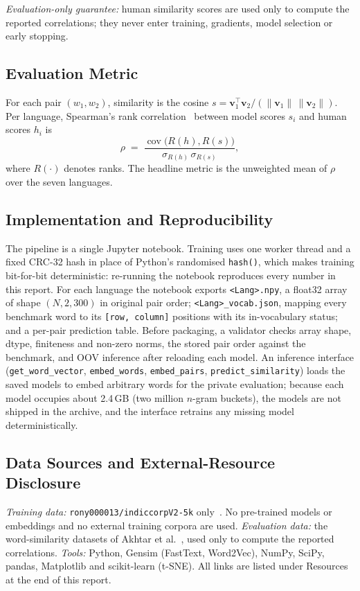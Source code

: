\documentclass[conference,10pt]{IEEEtran}
\begin{document}
\textit{Evaluation-only guarantee:} human similarity scores are used only to compute the reported correlations; they never enter training, gradients, model selection or early stopping.

\subsection{Evaluation Metric}\label{sec:metric}
For each pair $(w_1, w_2)$, similarity is the cosine $s = \mathbf{v}_1^{\top}\mathbf{v}_2 / (\lVert\mathbf{v}_1\rVert\,\lVert\mathbf{v}_2\rVert)$. Per language, Spearman's rank correlation~\cite{spearman1904} between model scores $s_i$ and human scores $h_i$ is
\begin{equation}
\rho \;=\; \frac{\operatorname{cov}\!\big(R(h), R(s)\big)}{\sigma_{R(h)}\,\sigma_{R(s)}},
\label{eq:spearman}
\end{equation}
where $R(\cdot)$ denotes ranks. The headline metric is the unweighted mean of $\rho$ over the seven languages.

\subsection{Implementation and Reproducibility}
The pipeline is a single Jupyter notebook. Training uses one worker thread and a fixed CRC-32 hash in place of Python's randomised \texttt{hash()}, which makes training bit-for-bit deterministic: re-running the notebook reproduces every number in this report. For each language the notebook exports \texttt{<Lang>.npy}, a float32 array of shape $(N, 2, 300)$ in original pair order; \texttt{<Lang>\_vocab.json}, mapping every benchmark word to its \texttt{[row, column]} positions with its in-vocabulary status; and a per-pair prediction table. Before packaging, a validator checks array shape, dtype, finiteness and non-zero norms, the stored pair order against the benchmark, and OOV inference after reloading each model. An inference interface (\texttt{get\_word\_vector}, \texttt{embed\_words}, \texttt{embed\_pairs}, \texttt{predict\_similarity}) loads the saved models to embed arbitrary words for the private evaluation; because each model occupies about 2.4\,GB (two million $n$-gram buckets), the models are not shipped in the archive, and the interface retrains any missing model deterministically.

\subsection{Data Sources and External-Resource Disclosure}
\textit{Training data:} \texttt{rony000013/indiccorpV2-5k} only~\cite{doddapaneni2023}. No pre-trained models or embeddings and no external training corpora are used. \textit{Evaluation data:} the word-similarity datasets of Akhtar et al.~\cite{akhtar2017}, used only to compute the reported correlations. \textit{Tools:} Python, Gensim (FastText, Word2Vec), NumPy, SciPy, pandas, Matplotlib and scikit-learn (t-SNE). All links are listed under Resources at the end of this report.
\end{document}
